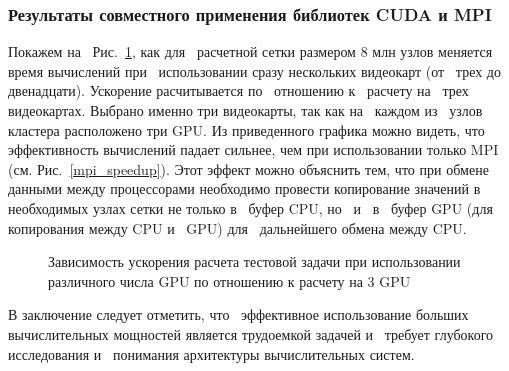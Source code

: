 \subsubsection{Результаты совместного применения библиотек CUDA и MPI}

Покажем на~ Рис.~\ref{many_gpu}, как для~ расчетной сетки размером 8 млн узлов меняется время вычислений
при~ использовании сразу нескольких видеокарт (от~ трех до~ двенадцати). Ускорение расчитывается по~ отношению
к~ расчету на~ трех видеокартах.
Выбрано именно три видеокарты, так как на~ каждом из~ узлов кластера расположено три GPU. Из приведенного графика можно видеть,
что эффективность вычислений падает сильнее, чем при использовании только MPI (см. Рис.~\ref{mpi_speedup}). Этот эффект можно
объяснить тем, что при обмене данными между процессорами необходимо провести копирование значений в~ необходимых
узлах сетки не только в~ буфер CPU, но~ и~ в~ буфер GPU (для~ копирования между CPU и~ GPU) для~ дальнейшего обмена между CPU.

\begin{figure}[!h]
\begin{center}
\caption{Зависимость ускорения расчета тестовой задачи при использовании различного числа GPU по отношению к расчету на 3 GPU}
\label{many_gpu}
\end{center}
\end{figure}

В заключение следует отметить, что~ эффективное использование больших вычислительных
мощностей является трудоемкой задачей и~ требует глубокого исследования и~ понимания
архитектуры вычислительных систем.
